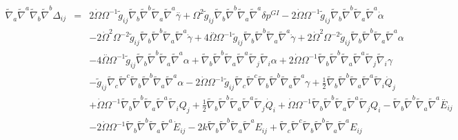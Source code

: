 \documentclass[10pt,letterpaper]{article}
\numberwithin{equation}{section}
\begin{document}
\begin{appendices}
\begin{eqnarray}
\tilde\nabla_a\tilde\nabla^a \tilde\nabla_b\tilde\nabla^b \Delta_{ij}&=& 2 \dot{\Omega} \Omega^{-1} \tilde{g}_{ij} \tilde{\nabla}_{b}\tilde{\nabla}^{b}\tilde{\nabla}_{a}\tilde{\nabla}^{a}\overset{..}{\gamma} + \Omega^2 \tilde{g}_{ij} \tilde{\nabla}_{b}\tilde{\nabla}^{b}\tilde{\nabla}_{a}\tilde{\nabla}^{a}\delta p^{GI}{} - 2 \dot{\Omega} \Omega^{-1} \tilde{g}_{ij} \tilde{\nabla}_{b}\tilde{\nabla}^{b}\tilde{\nabla}_{a}\tilde{\nabla}^{a}\dot{\alpha} \nonumber \\ 
&& - 2 \dot{\Omega}^2 \Omega^{-2} \tilde{g}_{ij} \tilde{\nabla}_{b}\tilde{\nabla}^{b}\tilde{\nabla}_{a}\tilde{\nabla}^{a}\dot{\gamma} + 4 \overset{..}{\Omega} \Omega^{-1} \tilde{g}_{ij} \tilde{\nabla}_{b}\tilde{\nabla}^{b}\tilde{\nabla}_{a}\tilde{\nabla}^{a}\dot{\gamma} + 2 \dot{\Omega}^2 \Omega^{-2} \tilde{g}_{ij} \tilde{\nabla}_{b}\tilde{\nabla}^{b}\tilde{\nabla}_{a}\tilde{\nabla}^{a}\alpha \nonumber \\ 
&& - 4 \overset{..}{\Omega} \Omega^{-1} \tilde{g}_{ij} \tilde{\nabla}_{b}\tilde{\nabla}^{b}\tilde{\nabla}_{a}\tilde{\nabla}^{a}\alpha + \tilde{\nabla}_{b}\tilde{\nabla}^{b}\tilde{\nabla}_{a}\tilde{\nabla}^{a}\tilde{\nabla}_{j}\tilde{\nabla}_{i}\alpha + 2 \dot{\Omega} \Omega^{-1} \tilde{\nabla}_{b}\tilde{\nabla}^{b}\tilde{\nabla}_{a}\tilde{\nabla}^{a}\tilde{\nabla}_{j}\tilde{\nabla}_{i}\gamma \nonumber \\ 
&& -  \tilde{g}_{ij} \tilde{\nabla}_{c}\tilde{\nabla}^{c}\tilde{\nabla}_{b}\tilde{\nabla}^{b}\tilde{\nabla}_{a}\tilde{\nabla}^{a}\alpha - 2 \dot{\Omega} \Omega^{-1} \tilde{g}_{ij} \tilde{\nabla}_{c}\tilde{\nabla}^{c}\tilde{\nabla}_{b}\tilde{\nabla}^{b}\tilde{\nabla}_{a}\tilde{\nabla}^{a}\gamma +\tfrac{1}{2} \tilde{\nabla}_{b}\tilde{\nabla}^{b}\tilde{\nabla}_{a}\tilde{\nabla}^{a}\tilde{\nabla}_{i}\dot{Q}_{j} \nonumber \\ 
&& + \dot{\Omega} \Omega^{-1} \tilde{\nabla}_{b}\tilde{\nabla}^{b}\tilde{\nabla}_{a}\tilde{\nabla}^{a}\tilde{\nabla}_{i}Q_{j} + \tfrac{1}{2} \tilde{\nabla}_{b}\tilde{\nabla}^{b}\tilde{\nabla}_{a}\tilde{\nabla}^{a}\tilde{\nabla}_{j}\dot{Q}_{i} + \dot{\Omega} \Omega^{-1} \tilde{\nabla}_{b}\tilde{\nabla}^{b}\tilde{\nabla}_{a}\tilde{\nabla}^{a}\tilde{\nabla}_{j}Q_{i}- \tilde{\nabla}_{b}\tilde{\nabla}^{b}\tilde{\nabla}_{a}\tilde{\nabla}^{a}\overset{..}{E}_{ij} \nonumber \\ 
&& - 2 \dot{\Omega} \Omega^{-1} \tilde{\nabla}_{b}\tilde{\nabla}^{b}\tilde{\nabla}_{a}\tilde{\nabla}^{a}\dot{E}_{ij} - 2 k \tilde{\nabla}_{b}\tilde{\nabla}^{b}\tilde{\nabla}_{a}\tilde{\nabla}^{a}E_{ij} + \tilde{\nabla}_{c}\tilde{\nabla}^{c}\tilde{\nabla}_{b}\tilde{\nabla}^{b}\tilde{\nabla}_{a}\tilde{\nabla}^{a}E_{ij}
\end{eqnarray}

\end{appendices}
\end{document}

